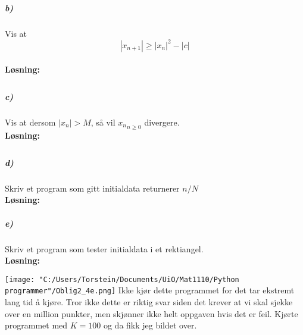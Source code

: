 \documentclass[11pt, A4paper,norsk]{article}
\begin{document}
			\subparagraph{b)}
				\begin{flushleft}
Vis at
$$|x_{n+1}| \geq |x_n|^2 - |c|$$ \\
\vspace{1mm}
\textbf{Løsning:} \\
\vspace{1mm}
					\begin{align}
\nonumber
					\end{align}
				\end{flushleft}











			\subparagraph{c)}
				\begin{flushleft}
Vis at dersom $|x_n| > M$, så vil ${x_n}_{n \geq 0}$ divergere. \\
\vspace{1mm}
\textbf{Løsning:} \\
\vspace{1mm}
					\begin{align}
\nonumber
					\end{align}
				\end{flushleft}













			\subparagraph{d)}
				\begin{flushleft}
Skriv et program som gitt initialdata returnerer $n/N$ \\
\vspace{1mm}
\textbf{Løsning:} \\
\vspace{1mm}

				\end{flushleft}










			\subparagraph{e)}
				\begin{flushleft}
Skriv et program som tester initialdata i et rektiangel. \\
\vspace{1mm}
\textbf{Løsning:} \\
\vspace{1mm}

\texttt{[image: "C:/Users/Torstein/Documents/UiO/Mat1110/Python programmer"/Oblig2\_4e.png]}
Ikke kjør dette programmet for det tar ekstremt lang tid å kjøre. Tror ikke dette er riktig svar siden det krever at vi skal sjekke over en million punkter, men skjønner ikke helt oppgaven hvis det er feil. Kjørte programmet med $K = 100$ og da fikk jeg bildet over.
				\end{flushleft}
\end{document}
